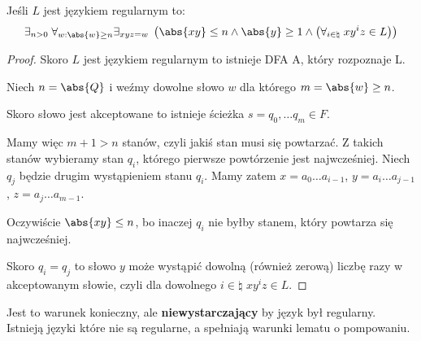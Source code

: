 \begin{lemma}
    Jeśli \( L \) jest językiem regularnym to:
    \[
        \exists_{n > 0}\; \forall_{w : \abs{w} \geq n} \exists_{xyz = w}\; \left( \abs{xy} \leq n \land \abs{y} \geq 1 \land \left( \forall_{i \in \natural}\; xy^iz \in L \right) \right)
    \]
\end{lemma}
\begin{proof}
    Skoro \( L \) jest językiem regularnym to istnieje DFA A, który rozpoznaje L.
    
    Niech \( n = \abs{Q} \) i weźmy dowolne słowo \( w \) dla którego \( m = \abs{w} \geq n \).
    
    Skoro słowo jest akceptowane to istnieje ścieżka \( s = q_0, \dots q_m \in F \).
    
    Mamy więc \( m + 1 > n \) stanów, czyli jakiś stan musi się powtarzać. 
    Z takich stanów wybieramy stan \( q_i \), którego pierwsze powtórzenie jest najwcześniej. Niech \( q_j \) będzie drugim wystąpieniem stanu \( q_i \).
    Mamy zatem \( x = a_0\dots a_{i-1} \), \( y = a_i\dots a_{j-1} \), \( z = a_j \dots a_{m-1} \).
    
    Oczywiście \( \abs{xy} \leq n \), bo inaczej \( q_i \) nie byłby stanem, który powtarza się najwcześniej.
    
    Skoro  \( q_i = q_j \) to słowo \( y \) może wystąpić dowolną (również zerową) liczbę razy w akceptowanym słowie, czyli dla dowolnego \( i \in \natural \) \( xy^iz \in L \).
\end{proof}
Jest to warunek konieczny, ale \textbf{niewystarczający} by język był regularny. Istnieją języki które nie są regularne, a spełniają warunki lematu o pompowaniu. 